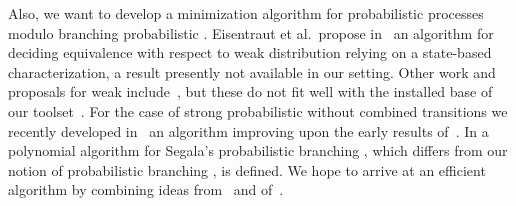 Also, we want to develop a minimization algorithm for probabilistic
processes modulo branching probabilistic {\bisimilarity}.  Eisentraut
et al.\ propose in~\cite{EHKTZ13:qest} an algorithm for deciding
equivalence with respect to weak distribution {\bisimilarity} relying
on a state-based characterization, a result presently not available in
our setting.  Other work and proposals for weak {\bisimilarity}
include~\cite{CS02:concur,FHHT16:fac,TH15:ic}, but these do not fit
well with the installed base of our toolset~\cite{Bun19:tacas}. For
the case of strong probabilistic {\bisimilarity} without combined
transitions we recently developed in~\cite{GRV18:algorithms} an
algorithm improving upon the early results of~\cite{BEM00:jcss}. In
\cite{TH15:ic} a polynomial algorithm for Segala's probabilistic
branching {\bisimilarity}, which differs from our notion of
probabilistic branching {\bisimilarity}, is defined. We hope to arrive
at an efficient algorithm by combining ideas
from~\cite{Val10:fi,VF10:tacas,TH15:ic} and
of~\cite{GV90:icalp,GJKW17:tcl}.
